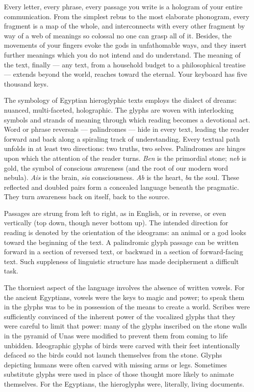 \documentclass[letterpaper,oneside]{memoir}
\begin{document}
\begin{description}
Every letter, every phrase, every passage you write is a hologram of your entire communication. From the simplest rebus to the most elaborate phonogram, every fragment is a map of the whole, and interconnects with every other fragment by way of a web of meanings so colossal no one can grasp all of it. Besides, the movements of your fingers evoke the gods in unfathomable ways, and they insert further meanings which you do not intend and do understand. The meaning of the text, finally --- any text, from a household budget to a philosophical treatise --- extends beyond the world, reaches toward the eternal. Your keyboard has five thousand keys.

The symbology of Egyptian hieroglyphic texts employs the dialect of dreams: nuanced, multi-faceted, holographic. The glyphs are woven with interlocking symbols and strands of meaning through which reading becomes a devotional act. Word or phrase reversals --- palindromes --- hide in every text, leading the reader forward and back along a spiraling track of understanding. Every textual path unfolds in at least two directions: two truths, two selves. Palindromes are hinges upon which the attention of the reader turns. \textit{Ben} is the primordial stone; \textit{neb} is gold, the symbol of conscious awareness (and the root of our modern word nebula). \textit{Ais} is the brain, \textit{sia} consciousness. \textit{Ab} is the heart, \textit{ba} the soul. These reflected and doubled pairs form a concealed language beneath the pragmatic. They turn awareness back on itself, back to the source.

Passages are strung from left to right, as in English, or in reverse, or even vertically (top down, though never bottom up). The intended direction for reading is denoted by the orientation of the ideograms: an animal or a god looks toward the beginning of the text. A palindromic glyph passage can be written forward in a section of reversed text, or backward in a section of forward-facing text. Such suppleness of linguistic structure has made decipherment a difficult task.

The thorniest aspect of the language involves the absence of written vowels. For the ancient Egyptians, vowels were the keys to magic and power; to speak them in the glyphs was to be in possession of the means to create a world. Scribes were sufficiently convinced of the inherent power of the vocalized glyphs that they were careful to limit that power: many of the glyphs inscribed on the stone walls in the pyramid of Unas were modified to prevent them from coming to life unbidden. Ideographic glyphs of birds were carved with their feet intentionally defaced so the birds could not launch themselves from the stone. Glyphs depicting humans were often carved with missing arms or legs. Sometimes substitute glyphs were used in place of those thought more likely to animate themselves. For the Egyptians, the hieroglyphs were, literally, living documents.


\end{description}
\end{document}
